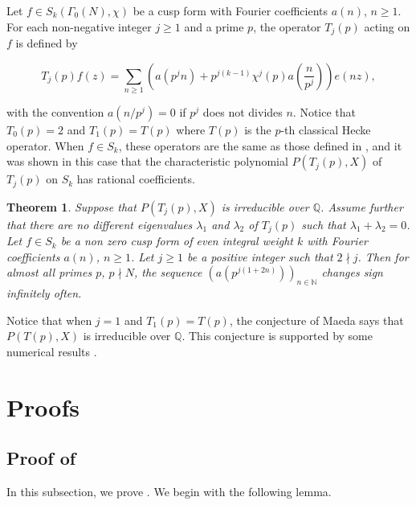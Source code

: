 \documentclass[smallcondensed]{svjour3}
\newtheorem{thm}{Theorem}
\begin{document}
Let $f\in S_k(\Gamma_{0}(N),\chi)$ be a cusp form with Fourier coefficients $a(n)$, $n\geq 1$. For each non-negative integer $j\geq 1$ and a prime $p$, the operator $T_j(p)$ acting on $f$ is defined by 

\begin{equation}
T_j(p)f(z)= \sum_{n\ge1}\left(a(p^{j}n)+p^{j(k-1)}\chi^{j}(p)a\left(\frac{n}{p^{j}}\right)\right)e(nz),\label{eq,4}
\end{equation}

with the convention $a(n/p^{j})=0$ if $p^j$ does not divides $n$. Notice that $T_0(p)=2$ and $T_1(p)=T(p)$ where $T(p)$ is the $p$-th classical Hecke operator. When $f\in S_k$, these operators are the same as those defined in \cite{kohnen14}, and it was shown in this case that the characteristic polynomial $P(T_{j}(p),X)$ of $T_{j}(p)$ on $S_k$ has rational coefficients.

\begin{thm}
Suppose that $P(T_{j}(p),X)$ is irreducible over $\mathbb{Q}$. Assume further that there are no different eigenvalues $\lambda_{1}$ and $\lambda_2$ of $T_{j}(p)$ such that $\lambda_1+\lambda_2=0$. Let $f\in S_k$ be a non zero cusp form of even integral weight $k$ with Fourier coefficients $a(n)$, $n\geq 1$. Let $j\ge1$ be a positive integer such that $2\nmid j$. Then for almost all primes $p$, $p\nmid N$, the sequence $\left(a(p^{j(1+2n)})\right)_{n\in{\mathbb N}}$ changes sign infinitely often.
\end{thm}

Notice that when $j=1$ and $T_1(p)=T(p)$, the conjecture of Maeda says that $P(T(p),X)$ is irreducible over $\mathbb{Q}$. This conjecture is supported by some numerical results \cite{baba,Ahlgren,farmer}. 

\section{Proofs}

\subsection{Proof of \texorpdfstring{}{Theorem 2}}

In this subsection, we prove . We begin with the following lemma.
\end{document}
